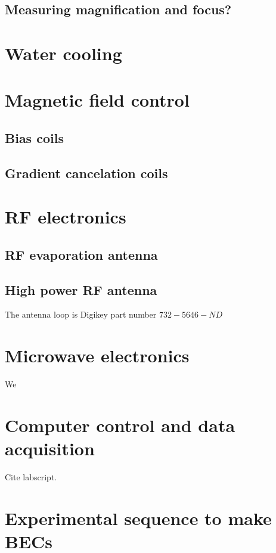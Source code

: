 \subsection{Measuring magnification and focus?}

\section{Water cooling}

\section{Magnetic field control}
\subsection{Bias coils}
\subsection{Gradient cancelation coils}

\section{RF electronics}
\subsection{RF evaporation antenna}
\subsection{High power RF antenna}
\label{sec:high_power_rf_antenna}
The antenna loop is Digikey part number $732-5646-ND$

\section{Microwave electronics}

We


\section{Computer control and data acquisition}
Cite labscript. 
\section{Experimental sequence to make BECs}
\label{sec:making-becs}



